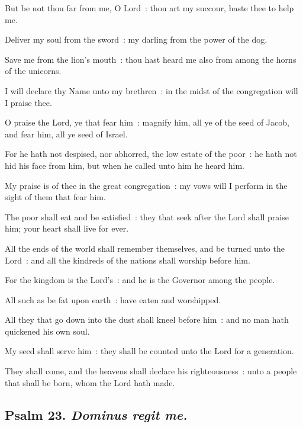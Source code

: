 But be not thou far from me, O Lord~: thou art my succour, haste thee to help me.\par
{}Deliver my soul from the sword~: my darling from the power of the dog.\par
{}Save me from the lion's mouth~: thou hast heard me also from among the horns of the unicorns.\par
{}I will declare thy Name unto my brethren~: in the midst of the congregation will I praise thee.\par
{}O praise the Lord, ye that fear him~: magnify him, all ye of the seed of Jacob, and fear him, all ye seed of Israel.\par
{}For he hath not despised, nor abhorred, the low estate of the poor~: he hath not hid his face from him, but when he called unto him he heard him.\par
{}My praise is of thee in the great congregation~: my vows will I perform in the sight of them that fear him.\par
{}The poor shall eat and be satisfied~: they that seek after the Lord shall praise him; your heart shall live for ever.\par
{}All the ends of the world shall remember themselves, and be turned unto the Lord~: and all the kindreds of the nations shall worship before him.\par
{}For the kingdom is the Lord's~: and he is the Governor among the people.\par
{}All such as be fat upon earth~: have eaten and worshipped.\par
{}All they that go down into the dust shall kneel before him~: and no man hath quickened his own soul.\par
{}My seed shall serve him~: they shall be counted unto the Lord for a generation.\par
{}They shall come, and the heavens shall declare his righteousness~: unto a people that shall be born, whom the Lord hath made.\par

\clearpage
\subsection{Psalm 23. \textit{Dominus regit me.}}


